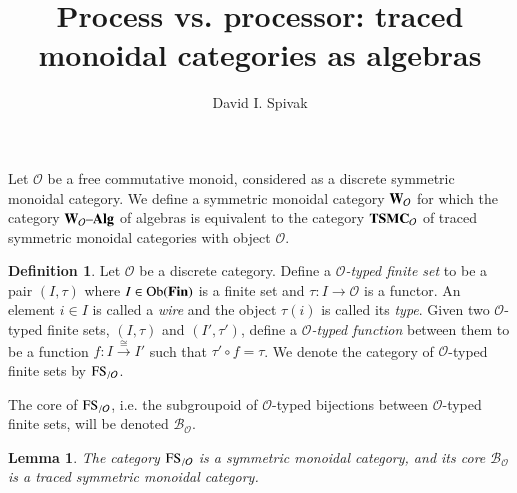 \documentclass{amsart}
\def\tn{\textnormal}
\def\mc{\mathcal}
\def\Ob{\tn{Ob}}
\def\to{\rightarrow}
\def\taking{\colon}
\def\iso{\cong}
\newcommand{\To}[1]{\xrightarrow{#1}}
\def\alg{{\text \textendash}{\bf Alg}}
\def\mcB{\mc{B}}
\def\mcO{\mc{O}}
\def\bfW{{\bf W}}
\def\Fin{{\bf Fin}}
\newcommand{\Wir}[1]{\bfW_{#1}}
\def\TSMC{{\bf TSMC}}
\newcommand{\FS}[1]{\tn{FS}_{/\mathcal{#1}}}
\newcommand{\Bij}[1]{\mcB_{\mathcal{#1}}}
\newtheorem{lemma}[subsubsection]{Lemma}
\theoremstyle{remark}
\theoremstyle{definition}
\newtheorem{definition}[subsubsection]{Definition}
\begin{document}
\title{Process vs. processor: traced monoidal categories as algebras}

\author{David I. Spivak}

\maketitle

\tableofcontents

Let $\mcO$ be a free commutative monoid, considered as a discrete symmetric monoidal category. We define a symmetric monoidal category $\Wir{\mcO}$ for which the category $\Wir{\mcO}\alg$ of algebras is equivalent to the category $\TSMC_\mcO$ of traced symmetric monoidal categories with object $\mcO$.

\begin{definition}

Let $\mcO$ be a discrete category. Define a {\em $\mcO$-typed finite set} to be a pair $(I,\tau)$ where $I\in\Ob(\Fin)$ is a finite set and $\tau\taking I\to\mcO$ is a functor. An element $i\in I$ is called a {\em wire} and the object $\tau(i)$ is called its {\em type}. Given two $\mcO$-typed finite sets, $(I,\tau)$ and $(I',\tau')$, define a {\em $\mcO$-typed function} between them to be a function $f\taking I\To{\iso} I'$ such that $\tau'\circ f=\tau$. We denote the category of $\mcO$-typed finite sets by $\FS{O}$.

The core of $\FS{O}$, i.e. the subgroupoid of $\mcO$-typed bijections between $\mcO$-typed finite sets, will be denoted $\Bij{O}$.

\end{definition}

\begin{lemma}

The category $\FS{O}$ is a symmetric monoidal category, and its core $\Bij{O}$ is a traced symmetric monoidal category.

\end{lemma}
\end{document}
